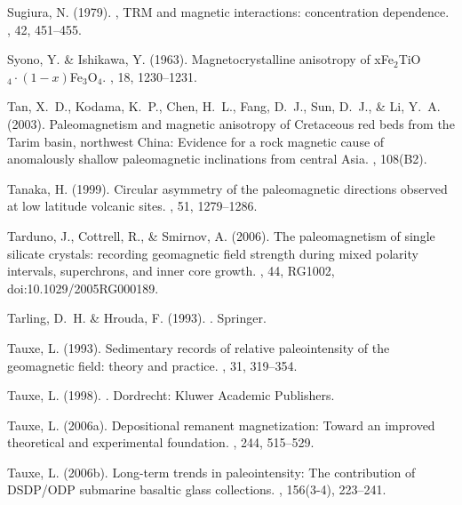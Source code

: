 \documentclass[11pt]{book}
\begin{document}
\begin{thebibliography}{}
Sugiura, N. (1979).
, {TRM} and magnetic interactions: concentration dependence.
, 42, 451--455.

Syono, Y. \& Ishikawa, Y. (1963).
\newblock Magnetocrystalline anisotropy of xFe$_2$TiO$_4\cdot(1-x)$Fe$_3$O$_4$.
, 18, 1230--1231.

Tan, X.~D., Kodama, K.~P., Chen, H.~L., Fang, D.~J., Sun, D.~J., \& Li, Y.~A.
  (2003).
\newblock Paleomagnetism and magnetic anisotropy of Cretaceous red beds from
  the Tarim basin, northwest China: Evidence for a rock magnetic cause of
  anomalously shallow paleomagnetic inclinations from central Asia.
, 108(B2).

Tanaka, H. (1999).
\newblock Circular asymmetry of the paleomagnetic directions observed at low
  latitude volcanic sites.
, 51, 1279--1286.

Tarduno, J., Cottrell, R., \& Smirnov, A. (2006).
\newblock The paleomagnetism of single silicate crystals: recording geomagnetic
  field strength during mixed polarity intervals, superchrons, and inner core
  growth.
, 44, RG1002, doi:10.1029/2005RG000189.

Tarling, D.~H. \& Hrouda, F. (1993).
.
\newblock Springer.

Tauxe, L. (1993).
\newblock Sedimentary records of relative paleointensity of the geomagnetic
  field: theory and practice.
, 31, 319--354.

Tauxe, L. (1998).
.
\newblock Dordrecht: Kluwer Academic Publishers.

Tauxe, L. (2006a).
\newblock Depositional remanent magnetization: Toward an improved theoretical
  and experimental foundation.
, 244, 515--529.

Tauxe, L. (2006b).
\newblock Long-term trends in paleointensity: The contribution of DSDP/ODP
  submarine basaltic glass collections.
, 156(3-4), 223--241.


\end{thebibliography}
\end{document}
